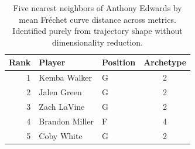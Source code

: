 \begin{table}[htbp]
  \centering\small
  \begin{tabular}{rllc}
    \toprule
    Rank & Player & Position & Archetype \\
    \midrule
    1 & Kemba Walker & G & 2 \\
    2 & Jalen Green & G & 2 \\
    3 & Zach LaVine & G & 2 \\
    4 & Brandon Miller & F & 4 \\
    5 & Coby White & G & 2 \\
    \bottomrule
  \end{tabular}
  \caption{Five nearest neighbors of Anthony Edwards by mean Fr\'{e}chet curve distance across metrics. Identified purely from trajectory shape without dimensionality reduction.}
  \label{tab:Anthony_Edwards_frechet_curve_neighbors}
\end{table}

